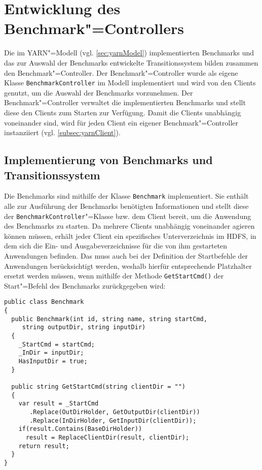 \section{Entwicklung des Benchmark"=Controllers}
\label{sec:benchmarkController}

Die im YARN"=Modell (vgl. \cref{sec:yarnModel}) implementierten Benchmarks und das zur Auswahl der Benchmarks entwickelte Transitionssystem bilden zusammen den Benchmark"=Controller.
Der Benchmark"=Controller wurde als eigene Klasse \texttt{BenchmarkController} im Modell implementiert und wird von den Clients genutzt, um die Auswahl der Benchmarks vorzunehmen.
Der Benchmark"=Controller verwaltet die implementierten Benchmarks und stellt diese den Clients zum Starten zur Verfügung.
Damit die Clients unabhängig voneinander sind, wird für jeden Client ein eigener Benchmark"=Controller instanziiert (vgl. \cref{subsec:yarnClient}).

\subsection{Implementierung von Benchmarks und Transitionssystem}
\label{subsec:appImplementation}

Die Benchmarks sind mithilfe der Klasse \texttt{Benchmark} implementiert.
Sie enthält alle zur Ausführung der Benchmarks benötigten Informationen und stellt diese der \texttt{BenchmarkController}"=Klasse bzw. dem Client bereit, um die Anwendung des Benchmarks zu starten.
Da mehrere Clients unabhängig voneinander agieren können müssen, erhält jeder Client ein spezifisches Unterverzeichnis im HDFS, in dem sich die Ein- und Ausgabeverzeichnisse für die von ihm gestarteten Anwendungen befinden.
Das muss auch bei der Definition der Startbefehle der Anwendungen berücksichtigt werden, weshalb hierfür entsprechende Platzhalter ersetzt werden müssen, wenn mithilfe der Methode \texttt{GetStartCmd()} der Start"=Befehl des Benchmarks zurückgegeben wird:

\begin{lstlisting}[label=lst:benchmarkClass,style=cs,
caption={[Wesentliche Methoden der Klasse Benchmark]
    Wesentliche Methoden der Klasse \texttt{Benchmark}}]
public class Benchmark
{
  public Benchmark(int id, string name, string startCmd,
     string outputDir, string inputDir)
  {
    _StartCmd = startCmd;
    _InDir = inputDir;
    HasInputDir = true;
  }
  
  public string GetStartCmd(string clientDir = "")
  {
    var result = _StartCmd
       .Replace(OutDirHolder, GetOutputDir(clientDir))
       .Replace(InDirHolder, GetInputDir(clientDir));
    if(result.Contains(BaseDirHolder))
      result = ReplaceClientDir(result, clientDir);
    return result;
  }
}
\end{lstlisting}

